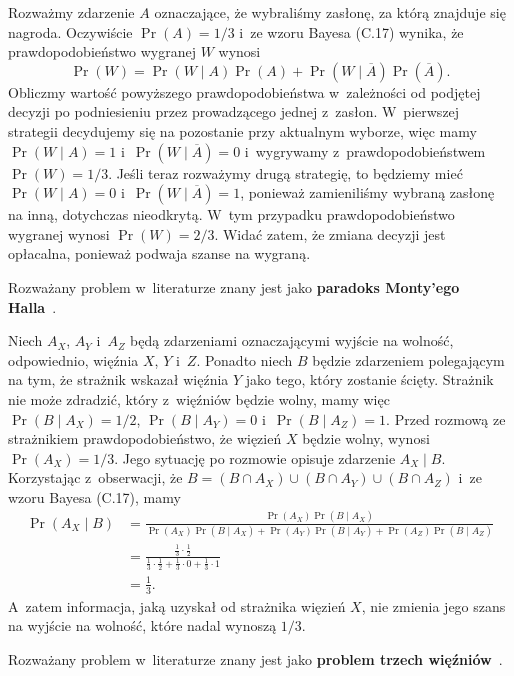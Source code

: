 \exercise %
Rozważmy zdarzenie $A$ oznaczające, że wybraliśmy zasłonę, za którą znajduje się nagroda.
Oczywiście $\Pr(A)=1/3$ i~ze wzoru Bayesa (C.17) wynika, że prawdopodobieństwo wygranej $W$ wynosi
\[
	\Pr(W) = \Pr(W\mid A)\Pr(A)+\Pr(W\mid\overline{A})\Pr(\overline{A}).
\]
Obliczmy wartość powyższego prawdopodobieństwa w~zależności od podjętej decyzji po podniesieniu przez prowadzącego jednej z~zasłon.
W~pierwszej strategii decydujemy się na pozostanie przy aktualnym wyborze, więc mamy $\Pr(W\mid A)=1$ i~$\Pr(W\mid\overline{A})=0$ i~wygrywamy z~prawdopodobieństwem $\Pr(W)=1/3$.
Jeśli teraz rozważymy drugą strategię, to będziemy mieć $\Pr(W\mid A)=0$ i~$\Pr(W\mid\overline{A})=1$, ponieważ zamieniliśmy wybraną zasłonę na inną, dotychczas nieodkrytą.
W~tym przypadku prawdopodobieństwo wygranej wynosi $\Pr(W)=2/3$.
Widać zatem, że zmiana decyzji jest opłacalna, ponieważ podwaja szanse na wygraną.

Rozważany problem w~literaturze znany jest jako \textbf{paradoks Monty'ego Halla}~\cite{montyhall}.

\exercise %
Niech $A_X$, $A_Y$ i~$A_Z$ będą zdarzeniami oznaczającymi wyjście na wolność, odpowiednio, więźnia $X$, $Y$ i~$Z$.
Ponadto niech $B$ będzie zdarzeniem polegającym na tym, że strażnik wskazał więźnia $Y$ jako tego, który zostanie ścięty.
Strażnik nie może zdradzić, który z~więźniów będzie wolny, mamy więc $\Pr(B\mid A_X)=1/2$, $\Pr(B\mid A_Y)=0$ i~$\Pr(B\mid A_Z)=1$.
Przed rozmową ze strażnikiem prawdopodobieństwo, że więzień $X$ będzie wolny, wynosi $\Pr(A_X)=1/3$.
Jego sytuację po rozmowie opisuje zdarzenie $A_X\mid B$.
Korzystając z~obserwacji, że $B=(B\cap A_X)\cup(B\cap A_Y)\cup(B\cap A_Z)$ i~ze wzoru Bayesa (C.17), mamy
\begin{align*}
    \Pr(A_X\mid B) &= \frac{\Pr(A_X)\Pr(B\mid A_X)}{\Pr(A_X)\Pr(B\mid A_X)+\Pr(A_Y)\Pr(B\mid A_Y)+\Pr(A_Z)\Pr(B\mid A_Z)} \\
	&= \frac{\frac{1}{3}\cdot\frac{1}{2}}{\frac{1}{3}\cdot\frac{1}{2}+\frac{1}{3}\cdot0+\frac{1}{3}\cdot1} \\[2mm]
	&= \frac{1}{3}.
\end{align*}
A~zatem informacja, jaką uzyskał od strażnika więzień $X$, nie zmienia jego szans na wyjście na wolność, które nadal wynoszą $1/3$.

Rozważany problem w~literaturze znany jest jako \textbf{problem trzech więźniów}~\cite{threeprisoners}.
